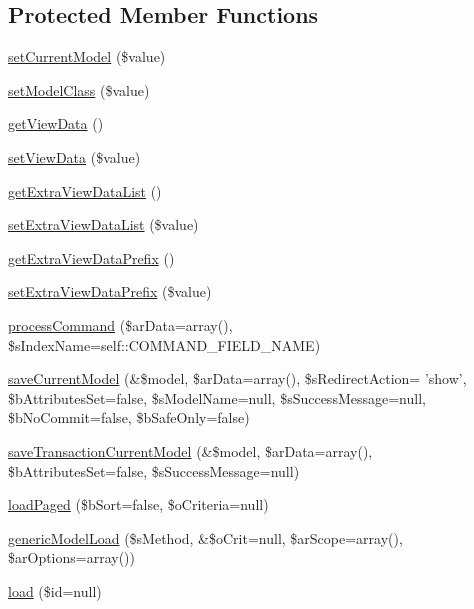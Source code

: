 \subsection*{Protected Member Functions}
\begin{DoxyCompactItemize}
\item 
\hyperlink{classCXLController_a1da4e93942345da876819fb6b8614a26}{setCurrentModel} (\$value)
\item 
\hyperlink{classCXLController_a24e8b6f39d6a823d94317e35f1b94758}{setModelClass} (\$value)
\item 
\hyperlink{classCXLController_a09cb66dd061fa338ab2a85a31f5ccf00}{getViewData} ()
\item 
\hyperlink{classCXLController_ade714d0b090e663e7acd6ef596d602ec}{setViewData} (\$value)
\item 
\hyperlink{classCXLController_a095ad5a2da0a46cf0c5225c826b7fe4c}{getExtraViewDataList} ()
\item 
\hyperlink{classCXLController_a537201d018053eaff662e290be1a8a81}{setExtraViewDataList} (\$value)
\item 
\hyperlink{classCXLController_a1f4c82d1446cb4a49f0da9bc76e5aa1e}{getExtraViewDataPrefix} ()
\item 
\hyperlink{classCXLController_ae80dd653d6c5d9e7be65cd7ae3f05627}{setExtraViewDataPrefix} (\$value)
\item 
\hyperlink{classCXLController_ae4991b44dadced9ed4c2548c8a52b72e}{processCommand} (\$arData=array(), \$sIndexName=self::COMMAND\_\-FIELD\_\-NAME)
\item 
\hyperlink{classCXLController_af6aedd6d8077a2728f4e7f1fad56d5a2}{saveCurrentModel} (\&\$model, \$arData=array(), \$sRedirectAction= 'show', \$bAttributesSet=false, \$sModelName=null, \$sSuccessMessage=null, \$bNoCommit=false, \$bSafeOnly=false)
\item 
\hyperlink{classCXLController_aefd99225a64bed9ce7e820c430fc37d4}{saveTransactionCurrentModel} (\&\$model, \$arData=array(), \$bAttributesSet=false, \$sSuccessMessage=null)
\item 
\hyperlink{classCXLController_a138d56ab26b272430a88450638c6d466}{loadPaged} (\$bSort=false, \$oCriteria=null)
\item 
\hyperlink{classCXLController_aacb2f651978f6aa962de80bc0248b3d9}{genericModelLoad} (\$sMethod, \&\$oCrit=null, \$arScope=array(), \$arOptions=array())
\item 
\hyperlink{classCXLController_a90f83714d8df3e6f07b28fb5d25e7116}{load} (\$id=null)
\item 

\end{DoxyCompactItemize}
